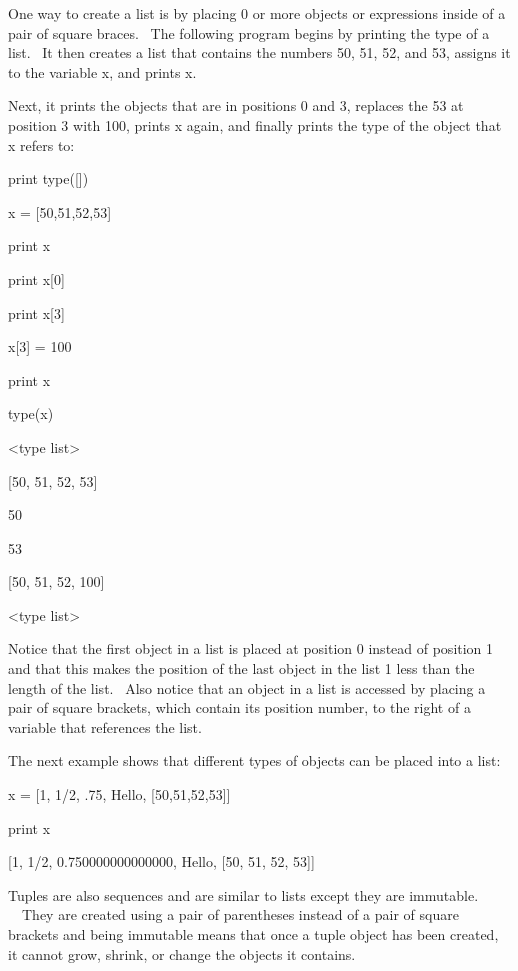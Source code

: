 \documentclass[12pt,twoside]{book}
\begin{document}
One way to create a list is by placing 0 or more objects or expressions
inside of a pair of square braces. \ The following program begins by
printing the type of a list. \ It then creates a list that contains the
numbers 50, 51, 52, and 53, assigns it to the variable x, and prints x.

Next, it prints the objects that are in positions 0 and 3, replaces the
53 at position 3 with 100, prints x again, and finally prints the type
of the object that x refers to:


\bigskip

print type([])

x = [50,51,52,53]

print x

print x[0]

print x[3]

x[3] = 100

print x

type(x)

{\textbar}

{\textless}type {\textquotesingle}list{\textquotesingle}{\textgreater}

[50, 51, 52, 53]

50

53

[50, 51, 52, 100]

{\textless}type {\textquotesingle}list{\textquotesingle}{\textgreater}


\bigskip

Notice that the first object in a list is placed at position 0 instead
of position 1 and that this makes the position of the last object in
the list 1 less than the length of the list. \ Also notice that an
object in a list is accessed by placing a pair of square brackets,
which contain its position number, to the right of a variable that
references the list.

The next example shows that different types of objects can be placed
into a list:


\bigskip

x = [1, 1/2, .75, {\textquotesingle}Hello{\textquotesingle},
[50,51,52,53]]

print x

{\textbar}

[1, 1/2, 0.750000000000000, {\textquotesingle}Hello{\textquotesingle},
[50, 51, 52, 53]]

Tuples are also sequences and are similar to lists except they are
immutable. \ \ They are created using a pair of parentheses instead of
a pair of square brackets and being immutable means that once a tuple
object has been created, it cannot grow, shrink, or change the objects
it contains. \ 
\end{document}
